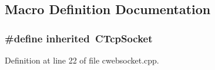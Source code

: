 \subsection{Macro Definition Documentation}
\subsubsection[{inherited}]{\setlength{\rightskip}{0pt plus 5cm}\#define inherited~C\+Tcp\+Socket}\label{cwebsocket_8cpp_a3920e3b7cb0909b941b2409493acf8f1}


Definition at line 22 of file cwebsocket.\+cpp.

